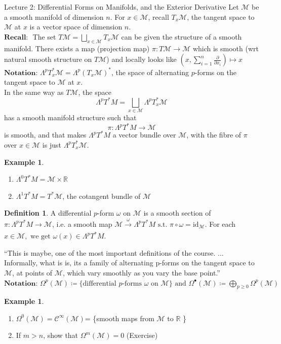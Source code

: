 \documentclass[10pt]{article}
\theoremstyle{plain}
\theoremstyle{definition}
\newtheorem{defn}[thm]{Definition} %
\newtheorem{exmp}[thm]{Example} %
\newcommand{\myand}{\text{ and }}
\newcommand{\st}{\text{ s.t. }}
\newcommand{\Recall}{\textbf{Recall: }}
\newcommand{\Notation}{\textbf{Notation: }}
\newcommand{\id}{\text{id}}
\newcommand{\Real}{\mathbb{R}}
\newcommand{\man}{\mathcal{M}}
\newcommand{\xman}{x\in\man}
\newcommand{\setform}[2]{\Lambda^{#1} {#2}}
\newcommand{\tang}{T_x\man}
\newcommand{\dualtang}{T_x^*\man}
\newcommand{\dualtangbundle}{T^*\man}
\newcommand{\difftang}{\setform{p}{\dualtang}}
\newcommand{\difftangbundle}{\setform{p}{T^*M}}
\newcommand{\pdifftangbundle}[1]{\setform{#1}{T^*M}}
\newcommand{\pformman}[1]{\Omega^{#1}(\man)}
\newcommand{\manforms}{\Omega^\bullet(\man)}
\begin{document}
\begin{section}{Lecture 2: Differential Forms on Manifolds, and the Exterior Derivative}
Let $\man $ be a smooth manifold of dimension $n$. For $\xman$, recall $T_x\man$, the tangent space to $\man$ at $x$ is a vector space of dimension $n$.\\
$\Recall$ The set $T\man = \bigsqcup\limits_{x\in\man}\tang$ can be given the structure of a smooth manifold. There exists a map (projection map) $\pi:T\man \to \man$ which is smooth (wrt natural smooth structure on $T\man$) and locally looks like $(x, \sum\limits_{i=1}^n \frac{\partial}{\partial x_i}) \mapsto x$\\
$\Notation \setform{p}{\dualtang} = \setform{p}{(\tang)^*}$, the space of alternating $p$-forms on the tangent space to $\man$ at $x$.\\
In the same way as $T\man$, the space 
$$\difftangbundle = \bigsqcup\limits_{x\in\man} \difftang$$
has a smooth manifold structure such that 
$$\pi : \difftangbundle \to \man$$
is smooth, and that makes $\difftangbundle$ a vector bundle over $\man$, with the fibre of $\pi$ over $x\in \man$ is just $\difftang$.

\begin{exmp}
\begin{enumerate}
    \item $\pdifftangbundle{0} = \man \times \Real$
    \item $\pdifftangbundle{1} = \dualtangbundle$, the cotangent bundle of $\man$
\end{enumerate}
\end{exmp}
\begin{defn}
A differential $p$-form $\omega$ on $\man$ is a smooth section of $\pi : \difftangbundle \to \man$, i.e. a smooth map $\man \xrightarrow[]{\omega}\difftangbundle \st \pi \circ \omega =  \id_\man.$ For each $x\in\man, \text{ we get } \omega(x) \in \difftangbundle$.
\end{defn}
``This is maybe, one of the most important definitions of the course. ... Informally, what is is, its a family of alternating p-forms on the tangent space to $\man$, at points of $\man$, which vary smoothly as you vary the base point.''\\
\noindent
$\Notation \pformman{p} \coloneqq \{\text{differential }p\text{-forms } \omega \text{ on } \man\} \myand \manforms\coloneqq\bigoplus\limits_{p\geq 0} \pformman{p}$

\begin{exmp}
\begin{enumerate}
    \item $\pformman{0} = \mathcal{C}^{\infty}(\man) $= \{smooth maps from $\man$ to $\Real$ \}
    \item If $m > n$, show that $\pformman{m} = 0$ (Exercise)
\end{enumerate}
\end{exmp}


\end{section}
\end{document}
